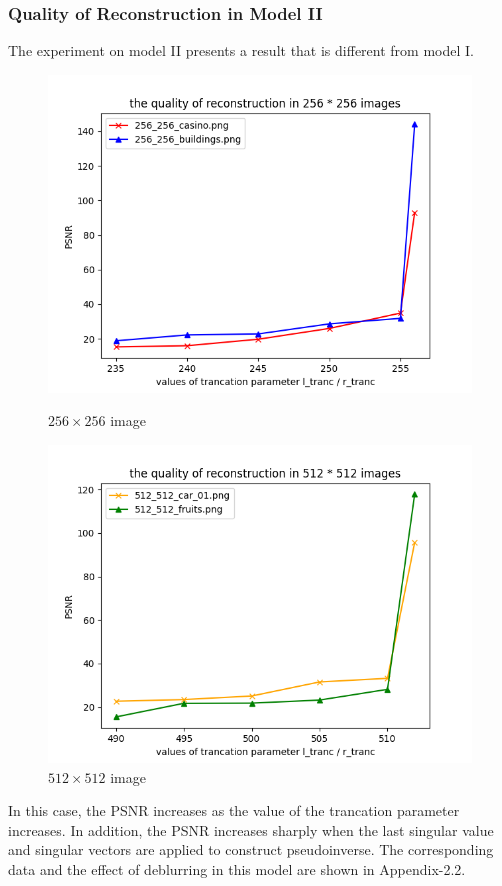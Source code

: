 \subsubsection{Quality of Reconstruction in Model II}
The experiment on model II presents a result that is different from model I. 
\begin{figure}[H]
    \centering
    \begin{minipage}[t]{0.45\linewidth} 
    \centering
    \includegraphics[width=\textwidth]{quality_256_model2.png}
    \caption{$256 \times 256$ image} 
    \end{minipage}
    \begin{minipage}[t]{0.45\linewidth}
    \centering 
    \includegraphics[width=\textwidth]{quality_512_model2.png}
    \caption{$512 \times 512$ image}
    \end{minipage}
\end{figure}
In this case, the PSNR increases as the value of the trancation parameter increases. In addition, the PSNR increases sharply when the last singular value and singular vectors are applied to construct pseudoinverse. The corresponding data and the effect of deblurring in this model are shown in Appendix-2.2.
